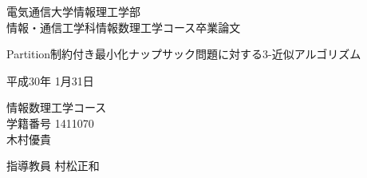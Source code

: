 \documentclass[11pt,dvipdfmx]{jarticle}
\numberwithin{equation}{section}
\begin{document}
\thispagestyle{empty}
\vfill
\hfill 電気通信大学情報理工学部 \\
\hfill 情報・通信工学科情報数理工学コース卒業論文

\vfill
\begin{center}
  \Large Partition制約付き最小化ナップサック問題に対する3-近似アルゴリズム
\end{center}
\vfill
\begin{center}
    平成30年  1月31日
\end{center}
\vfill
\begin{center}
  \large
  情報数理工学コース\\[1cm]
  学籍番号 1411070\\[1cm]
  木村優貴
\end{center}
\begin{center}
  指導教員 村松正和
\end{center}
\vfill

\pagebreak
\end{document}
